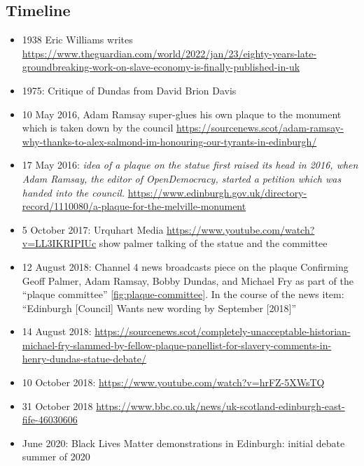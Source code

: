 \documentclass{scrartcl}
\begin{document}
\subsection{Timeline}

\begin{itemize}
    \item 1938 Eric Williams writes \url{https://www.theguardian.com/world/2022/jan/23/eighty-years-late-groundbreaking-work-on-slave-economy-is-finally-published-in-uk}
    \item 1975: Critique of Dundas from David Brion Davis \cite{davis_1975}
    \item 10 May 2016, Adam Ramsay super-glues his own plaque to the monument which is taken down by the council \url{https://sourcenews.scot/adam-ramsay-why-thanks-to-alex-salmond-im-honouring-our-tyrants-in-edinburgh/}
    \item 17 May 2016: \textit{idea of a plaque on the statue first raised its head in 2016, when Adam Ramsay, the editor of OpenDemocracy, started a petition which was handed into the council.}\cite{anderson_2021} \url{https://www.edinburgh.gov.uk/directory-record/1110080/a-plaque-for-the-melville-monument}
    \item 5 October 2017: Urquhart Media \url{https://www.youtube.com/watch?v=LL3IKRIPIUc} show palmer talking of the statue and the committee
    \item 12 August 2018: Channel 4 news broadcasts piece on the plaque \cite{c4n_2018} Confirming Geoff Palmer, Adam Ramsay, Bobby Dundas, and Michael Fry as part of the ``plaque committee'' \ref{fig:plaque-committee}. In the course of the news item: ``Edinburgh [Council] Wants new wording by September [2018]''
    \item 14 August 2018: \url{https://sourcenews.scot/completely-unacceptable-historian-michael-fry-slammed-by-fellow-plaque-panellist-for-slavery-comments-in-henry-dundas-statue-debate/}
    \item 10 October 2018: \url{https://www.youtube.com/watch?v=hrFZ-5XWsTQ}
    \item 31 October 2018 \url{https://www.bbc.co.uk/news/uk-scotland-edinburgh-east-fife-46030606}
    \item June 2020: Black Lives Matter demonstrations in Edinburgh: initial debate summer of 2020 \cite{mccarthy_2022_1}
    \begin{itemize}


\end{itemize}
\end{itemize}
\end{document}
